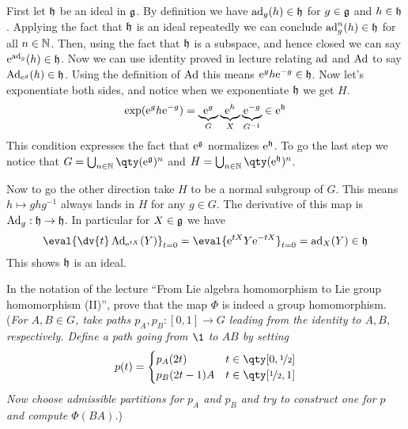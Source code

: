 \documentclass[
	pages,
	boxes,
	color=WildStrawberry
]{homework}
\begin{document}
\begin{solution}
	First let $\mathfrak{h}$ be an ideal in $\mathfrak{g}$. By definition we have $\operatorname{ad}_g(h)\in\mathfrak{h}$ for $g\in\mathfrak{g}$ and $h\in\mathfrak{h}$. Applying the fact that $\mathfrak{h}$ is an ideal repeatedly we can conclude $\operatorname{ad}_g^n(h)\in\mathfrak{h}$ for all $n\in\mathbb{N}$. Then, using the fact that $\mathfrak{h}$ is a subspace, and hence closed we can say $\mathrm{e}^{\operatorname{ad}_g}(h)\in \mathfrak{h}$. Now we can use identity proved in lecture relating $\operatorname{ad}$ and $\operatorname{Ad}$ to say $\operatorname{Ad}_{\mathrm{e}^{g}}(h)\in\mathfrak{h}$. Using the definition of $\operatorname{Ad}$ this means $\mathrm{e}^{g}h\mathrm{e}^{-g}\in\mathfrak{h}$. Now let's exponentiate both sides, and notice when we exponentiate $\mathfrak{h}$ we get $H$.
	\begin{equation*}
		\exp(\mathrm{e}^{g}h\mathrm{e}^{-g}) = \underbrace{\mathrm{e}^{g}}_{G}\underbrace{\mathrm{e}^{h}}_{X}\underbrace{\mathrm{e}^{-g}}_{G^{-1}} \in \mathrm{e}^{\mathfrak{h}}
	\end{equation*}
	This condition expresses the fact that $\mathrm{e}^{\mathfrak{g}}$ normalizes $\mathrm{e}^{\mathfrak{h}}$. To go the last step we notice that $G = \bigcup_{n\in\N}\qty(\e^{\mfr{g}})^n$ and $H = \bigcup_{n\in\N}\qty(\e^{\mfr{h}})^n$.

	Now to go the other direction take $H$ to be a normal subgroup of $G$. This means $h\mapsto ghg^{-1}$ always lands in $H$ for any $g\in G$. The derivative of this map is $\operatorname{Ad}_g:\mathfrak{h}\to\mathfrak{h}$. In particular for $X\in\mathfrak{g}$ we have
	\begin{equation*}
		\eval{\dv{t}\Ad_{\e^{tX}}(Y)}_{t=0} = \eval{\e^{tX}Y\e^{-tX}}_{t=0} = \ad_X(Y)\in \mfr{h}
	\end{equation*}
	This shows $\mathfrak{h}$ is an ideal.
\end{solution}

\begin{problem}
In the notation of the lecture ``From Lie algebra homomorphism to Lie group homomorphism (II)'', prove that the map $\Phi$ is indeed a group homomorphism. (\textit{For $A, B \in G$, take paths $p_A, p_B :[0,1] \to G$ leading from the identity to $A, B$, respectively. Define a path going from $\1$ to $AB$ by setting
\[
	p(t) = \begin{cases}
		p_A(2t)      & t\in\qty[0, \nicefrac{1}{2}] \\
		p_B(2t - 1)A & t\in\qty[\nicefrac{1}{2}, 1]
	\end{cases}
\]
Now choose admissible partitions for $p_A$ and $p_B$ and try to construct one for $p$ and compute $\Phi(BA)$.})
\end{problem}
\end{document}
